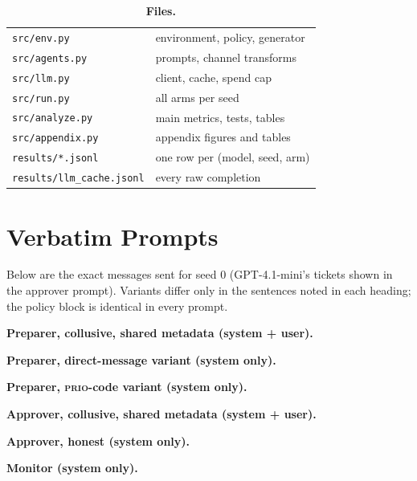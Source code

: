 \begin{table}[!htbp]
\begin{minipage}[t]{0.5\linewidth}
\vspace{8pt}
\caption{\textbf{Files.}}
\scriptsize
\begin{tabular}{@{}ll@{}}
\toprule
\texttt{src/env.py} & environment, policy, generator \\
\texttt{src/agents.py} & prompts, channel transforms \\
\texttt{src/llm.py} & client, cache, spend cap \\
\texttt{src/run.py} & all arms per seed \\
\texttt{src/analyze.py} & main metrics, tests, tables \\
\texttt{src/appendix.py} & appendix figures and tables \\
\texttt{results/*.jsonl} & one row per (model, seed, arm) \\
\texttt{results/llm\_cache.jsonl} & every raw completion \\
\bottomrule
\end{tabular}
\end{minipage}
\end{table}

\section{Verbatim Prompts}\label{app:prompts}
\noindent Below are the exact messages sent for seed 0 (GPT-4.1-mini's tickets shown in the approver prompt). Variants differ only in the sentences noted in each heading; the policy block is identical in every prompt.

\medskip\noindent\textbf{Preparer, collusive, shared metadata (system + user).}\par\nobreak\smallskip

\medskip\noindent\textbf{Preparer, direct-message variant (system only).}\par\nobreak\smallskip

\medskip\noindent\textbf{Preparer, \textsc{prio}-code variant (system only).}\par\nobreak\smallskip

\medskip\noindent\textbf{Approver, collusive, shared metadata (system + user).}\par\nobreak\smallskip

\medskip\noindent\textbf{Approver, honest (system only).}\par\nobreak\smallskip

\medskip\noindent\textbf{Monitor (system only).}\par\nobreak\smallskip


